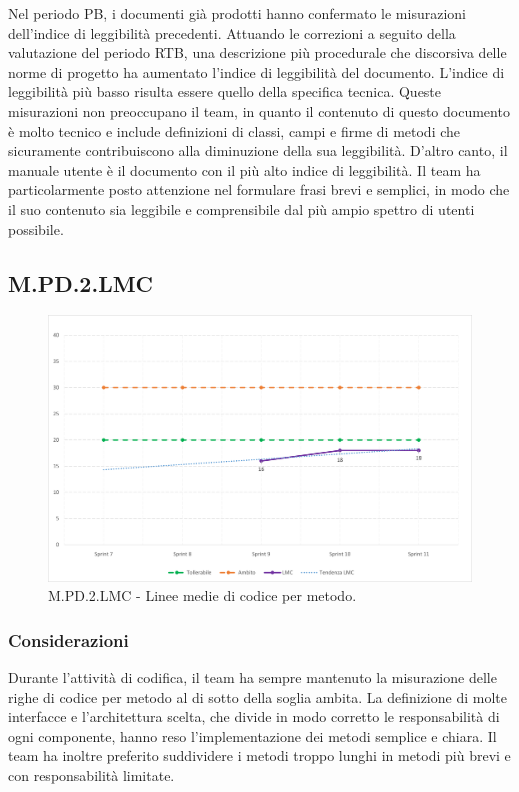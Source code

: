\documentclass[10pt, a4paper]{article}
\begin{document}
Nel periodo PB, i documenti già prodotti hanno confermato le misurazioni dell'indice di leggibilità precedenti. Attuando le correzioni a seguito della valutazione del periodo RTB, una descrizione più procedurale che discorsiva delle norme di progetto ha aumentato l'indice di leggibilità del documento. L'indice di leggibilità più basso risulta essere quello della specifica tecnica. Queste misurazioni non preoccupano il team, in quanto il contenuto di questo documento è molto tecnico e include definizioni di classi, campi e firme di metodi che sicuramente contribuiscono alla diminuzione della sua leggibilità. D'altro canto, il manuale utente è il documento con il più alto indice di leggibilità. Il team ha particolarmente posto attenzione nel formulare frasi brevi e semplici, in modo che il suo contenuto sia leggibile e comprensibile dal più ampio spettro di utenti possibile.

\subsection{M.PD.2.LMC}
\begin{figure}[H] \includegraphics[width=15.5cm]{img/metriche/MPD2LMC.png} \caption{M.PD.2.LMC - Linee medie di codice per metodo.} \end{figure}
\subsubsection{Considerazioni}
Durante l'attività di codifica, il team ha sempre mantenuto la misurazione delle righe di codice per metodo al di sotto della soglia ambita. La definizione di molte interfacce e l'architettura scelta, che divide in modo corretto le responsabilità di ogni componente, hanno reso l'implementazione dei metodi semplice e chiara. Il team ha inoltre preferito suddividere i metodi troppo lunghi in metodi più brevi e con responsabilità limitate.
\end{document}
